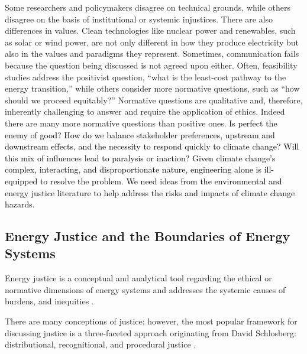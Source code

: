     Some researchers and policymakers disagree on technical grounds, while others disagree on the basis of institutional or systemic injustices. There are also differences in values. Clean technologies like nuclear power and renewables, such as solar or wind power, are not only different in how they produce electricity but also in the values and paradigms they represent. Sometimes, communication fails because the question being discussed is not agreed upon either. Often, feasibility studies address the positivist question, ``what is the least-cost pathway to the energy transition,'' while others consider more normative questions, such as ``how should we proceed equitably?'' Normative questions are qualitative and, therefore, inherently challenging to answer and require the application of ethics. Indeed there are many more normative questions than positive ones. \textcolor{black}{Is perfect the enemy of good? How do we balance stakeholder preferences, upstream and downstream effects, and the necessity to respond quickly to climate change? Will this mix of influences lead to paralysis or inaction?} \textcolor{black}{Given climate change's complex, interacting, and disproportionate nature, engineering alone is ill-equipped to resolve the problem. We need ideas from the environmental and energy justice literature to help address the risks and impacts of climate change hazards.}
\subsection{Energy Justice and the Boundaries of Energy Systems}

    
    
    Energy justice is a conceptual and analytical tool regarding the ethical or 
    normative dimensions of energy systems and addresses the systemic causes of burdens, and inequities \cite{sovacool_energy_2015}. 

        
        There are many conceptions of justice; however, the most popular framework for 
        discussing justice is a three-faceted approach originating from David Schlosberg: distributional, recognitional, and procedural justice \cite{schlosberg_2_2007}.

